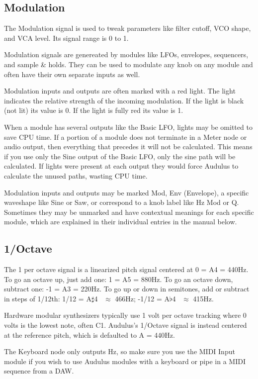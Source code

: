 \documentclass[11pt]{book}
\begin{document}
\subsection{Modulation}

The Modulation signal is used to tweak parameters like filter cutoff, VCO shape, and VCA level. Its signal range is 0 to 1. 

Modulation signals are genereated by modules like LFOs, envelopes, sequencers, and sample \& holds. They can be used to modulate any knob on any module and often have their own separate inputs as well.

Modulation inputs and outputs are often marked with a red light. The light indicates the relative strength of the incoming modulation. If the light is black (not lit) its value is 0. If the light is fully red its value is 1.

When a module has several outputs like the Basic LFO, lights may be omitted to save CPU time. If a portion of a module does not terminate in a Meter node or audio output, then everything that precedes it will not be calculated. This means if you use only the Sine output of the Basic LFO, only the sine path will be calculated. If lights were present at each output they would force Audulus to calculate the unused paths, wasting CPU time.

Modulation inputs and outputs may be marked Mod, Env (Envelope), a specific waveshape like Sine or Saw, or correspond to a knob label like Hz Mod or Q. Sometimes they may be unmarked and have contextual meanings for each specific module, which are explained in their individual entries in the manual below.

\subsection{1/Octave}

The 1 per octave signal is a linearized pitch signal centered at 0 = A4 = 440Hz. To go an octave up, just add one: 1 = A5 = 880Hz. To go an octave down, subtract one: -1 = A3 = 220Hz. To go up or down in semitones, add or subtract in steps of 1/12th: 1/12 = A$\sharp$4 \ $\approx$ 466Hz; -1/12 = A$\flat$4 \ $\approx$ 415Hz. 

Hardware modular synthesizers typically use 1 volt per octave tracking where 0 volts is the lowest note, often C1. Audulus's 1/Octave signal is instead centered at the reference pitch, which is defaulted to A = 440Hz. 

The Keyboard node only outputs Hz, so make sure you use the MIDI Input module if you wish to use Audulus modules with a keyboard or pipe in a MIDI sequence from a DAW.
\end{document}
